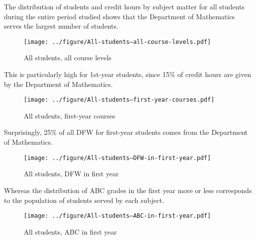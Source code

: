 \newpage
\vspace{\fill}
The distribution of students and credit hours by subject matter for all students during the entire period studied shows that the Department of Mathematics serves the largest number of students. 
\begin{figure}[ht]
  \centering 
    \texttt{[image: ../figure/All-students--all-course-levels.pdf]}
    \caption{All students, all course levels}
    \label{fig:../figure/All-students--all-course-levels}
\end{figure}

\newpage
\vspace{\fill}
This is particularly high for 1st-year students, since 15\% of credit hours are given by the Department of Mathematics.  
\begin{figure}[ht]
  \centering 
    \texttt{[image: ../figure/All-students--first-year-courses.pdf]}
    \caption{All students, first-year courses}
    \label{fig:../figure/All-students--first-year-courses}
\end{figure}

\newpage
\vspace{\fill}
Surprisingly, 25\% of all DFW for first-year students comes from the Department of Mathematics. 
\begin{figure}[ht]
  \centering 
    \texttt{[image: ../figure/All-students--DFW-in-first-year.pdf]}
    \caption{All students, DFW in first year}
    \label{fig:../figure/All-students--DFW-in-first-year}
\end{figure}

\newpage
\vspace{\fill}
Whereas the distribution of ABC grades in the first year more or less corresponds to the population of students served by each subject.  
\begin{figure}[ht]
  \centering 
    \texttt{[image: ../figure/All-students--ABC-in-first-year.pdf]}
    \caption{All students, ABC in first year}
    \label{fig:../figure/All-students--ABC-in-first-year}
\end{figure}

